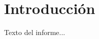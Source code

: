 \documentclass{template_utn}
\begin{document}
\maketitle

\tableofcontents
\newpage

\section{Introducción}

Texto del informe...
\end{document}
